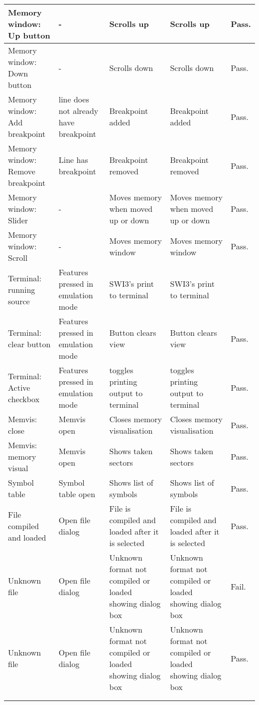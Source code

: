 \begin{landscape}
\begin{center}
\begin{tabular}{ | @{\makebox[2em][c]{\rownumber\space}} | p{4cm} |  p{5cm} | p{5cm} | p{5cm} | l |}
      Memory window: Up button & - & Scrolls up & Scrolls up & Pass. \\ \hline
      Memory window: Down button & - & Scrolls down & Scrolls down & Pass. \\ \hline
      Memory window: Add breakpoint & line does not already have breakpoint & Breakpoint added & Breakpoint added & Pass.\\ \hline
      Memory window: Remove breakpoint & Line has breakpoint & Breakpoint removed & Breakpoint removed & Pass.\\ \hline
      Memory window: Slider & - & Moves memory when moved up or down & Moves memory when moved up or down & Pass.\\ \hline
      Memory window: Scroll & - & Moves memory window & Moves memory window & Pass.\\ \hline
      Terminal: running source & Features pressed in emulation mode & SWI3's print to terminal & SWI3's print to terminal & \\ \hline
      Terminal: clear button & Features pressed in emulation mode & Button clears view & Button clears view & Pass.\\ \hline
      Terminal: Active checkbox & Features pressed in emulation mode & toggles printing output to terminal & toggles printing output to terminal & Pass.\\ \hline
      Memvis: close & Memvis open & Closes memory visualisation & Closes memory visualisation & Pass.\\ \hline
      Memvis: memory visual & Memvis open & Shows taken sectors & Shows taken sectors & Pass.\\ \hline
      Symbol table & Symbol table open & Shows list of symbols & Shows list of symbols & Pass.\\ \hline
      File compiled and loaded & Open file dialog & File is compiled and loaded after it is selected &File is compiled and loaded after it is selected & Pass. \\ \hline
      Unknown file & Open file dialog & Unknown format not compiled or loaded showing dialog box & Unknown format not compiled or loaded showing dialog box & Fail. \\ \hline
      Unknown file & Open file dialog & Unknown format not compiled or loaded showing dialog box & Unknown format not compiled or loaded showing dialog box & Pass. \\ \hline
      & & & & \\ \hline
      & & & & \\ \hline
  \end{tabular}
  \end{center}
  \restoregeometry
	\end{landscape}

